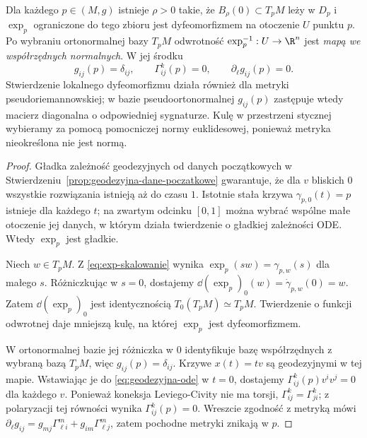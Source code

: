 \begin{twierdzenie}
\label{thm:wspolrzedne-normalne}
Dla każdego $p\in(M,g)$ istnieje $\rho>0$
takie, że $B_\rho(0)\subset T_pM$ leży w $D_p$
i $\exp_p$ ograniczone do tego zbioru jest
dyfeomorfizmem na otoczenie $U$ punktu $p$.
Po wybraniu ortonormalnej bazy $T_pM$
odwrotność $\exp_p^{-1}:U\to\R^n$ jest
\emph{mapą we współrzędnych normalnych}.
W jej środku
\begin{equation}\label{eq:normalne-metryka}
 g_{ij}(p)=\delta_{ij},\qquad
 \Gamma^k_{ij}(p)=0,\qquad
 \partial_\ell g_{ij}(p)=0.
\end{equation}
Stwierdzenie lokalnego dyfeomorfizmu działa
również dla metryki pseudoriemannowskiej;
w bazie pseudoortonormalnej $g_{ij}(p)$ zastępuje wtedy
macierz diagonalna o odpowiedniej sygnaturze. Kulę
w przestrzeni stycznej wybieramy za pomocą pomocniczej
normy euklidesowej, ponieważ metryka nieokreślona nie jest normą.
\end{twierdzenie}
\begin{proof}
Gładka zależność geodezyjnych od danych
początkowych w Stwierdzeniu~\ref{prop:geodezyjna-dane-poczatkowe}
gwarantuje, że dla $v$ bliskich $0$ wszystkie
rozwiązania istnieją aż do czasu $1$.
Istotnie stała krzywa $\gamma_{p,0}(t)=p$
istnieje dla każdego $t$; na zwartym odcinku
$[0,1]$ można wybrać wspólne małe otoczenie
jej danych, w którym działa twierdzenie o gładkiej
zależności ODE. Wtedy $\exp_p$ jest gładkie.

Niech $w\in T_pM$. Z \eqref{eq:exp-skalowanie}
wynika $\exp_p(sw)=\gamma_{p,w}(s)$ dla małego $s$.
Różniczkując w $s=0$, dostajemy
$\dd(\exp_p)_0(w)=\dot\gamma_{p,w}(0)=w$.
Zatem $\dd(\exp_p)_0$ jest identycznością
$T_0(T_pM)\simeq T_pM$. Twierdzenie o funkcji
odwrotnej daje mniejszą kulę, na której
$\exp_p$ jest dyfeomorfizmem.

W ortonormalnej bazie jej różniczka w $0$
identyfikuje bazę współrzędnych z wybraną bazą
$T_pM$, więc $g_{ij}(p)=\delta_{ij}$.
Krzywe $x(t)=tv$ są geodezyjnymi w tej mapie.
Wstawiając je do \eqref{eq:geodezyjna-ode}
w $t=0$, dostajemy
$\Gamma^k_{ij}(p)v^iv^j=0$ dla każdego $v$.
Ponieważ koneksja Leviego-Civity nie ma torsji,
$\Gamma^k_{ij}=\Gamma^k_{ji}$; z polaryzacji
tej równości wynika $\Gamma^k_{ij}(p)=0$.
Wreszcie zgodność z metryką mówi
$\partial_\ell g_{ij}
=g_{mj}\Gamma^m_{\ell i}
 +g_{im}\Gamma^m_{\ell j}$, zatem pochodne
metryki znikają w $p$.
\end{proof}

